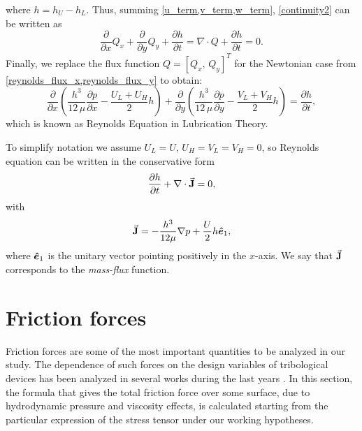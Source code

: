 where $h=h_U-h_L$. Thus, summing \eqref{u_term,v_term,w_term}, \eqref{continuity2} can be written as
\begin{equation*}
\frac{\partial}{\partial x}Q_x+\frac{\partial}{\partial y}Q_y+\frac{\partial h}{\partial t}=\nabla\cdot Q+\frac{\partial h}{\partial t}=0.
\end{equation*}
Finally, we replace the flux function $Q=[Q_x,\,Q_y]^T$ for the Newtonian case from \eqref{reynolds_flux_x,reynolds_flux_y} to obtain:
\begin{equation}
\frac{\partial}{\partial x}\left(\frac{h^3}{12\,\mu}\frac{\partial p}{\partial x}-\frac{U_L+U_H}{2}h\right)+\frac{\partial}{\partial y}\left(\frac{h^3}{12\,\mu}\frac{\partial p}{\partial y}-\frac{V_L+V_H}{2}h\right)=\frac{\partial h}{\partial t},\label{eq:reynoldseq}
\end{equation}
which is known as Reynolds Equation in Lubrication Theory.

To simplify notation we assume $U_L=U$, $U_H=V_L=V_H=0$, so Reynolds equation can be written in the conservative form
\begin{equation*}
\parder{h}{t}+\nabla\cdot \veca{J}=0,
\label{eq:reynoldseq_J}
\end{equation*}
with 
\begin{equation}
\veca{J}=-\frac{h^3}{12\mu}\nabla p+\frac{U}{2} h\bds{\hat{e}}_1,\label{eq:chap2_fluxJ}
\end{equation}
where $\boldsymbol{\hat{e}}_1$ is the unitary vector pointing positively in the $x$-axis. We say that $\vec{\mathbf{J}}$ corresponds to the \emph{mass-flux} function.
\section{Friction forces}\label{sec:friction_forces}
Friction forces are some of the most important quantities to be analyzed in our study. The dependence of such forces on the design variables of tribological devices has been analyzed in several works during the last years \cite{ryk2006,tomanik2013,checo2014a,medina2015}. In this section, the formula that gives the total friction force over some surface, due to hydrodynamic pressure and viscosity effects, is calculated starting from the particular expression of the stress tensor under our working hypotheses.

